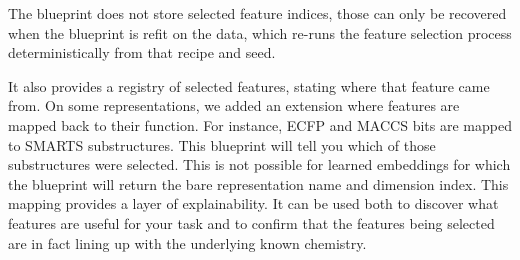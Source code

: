 The blueprint does not store selected feature indices, those can only be recovered when the blueprint is refit on the data, which re-runs the feature selection process deterministically from that recipe and seed.

It also provides a registry of selected features, stating where that feature came from. On some representations, we added an extension where features are mapped back to their function. For instance, ECFP and MACCS bits are mapped to SMARTS substructures. This blueprint will tell you which of those substructures were selected. This is not possible for learned embeddings for which the blueprint will return the bare representation name and dimension index. This mapping provides a layer of explainability. It can be used both to discover what features are useful for your task and to confirm that the features being selected are in fact lining up with the underlying known chemistry.

